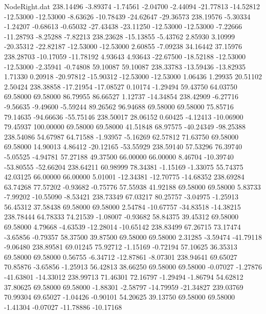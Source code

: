 \begin{filecontents}{NodeRight.dat}
 238.14496   -3.89374   -1.74561    -2.04700   -2.44094  -21.77813  -14.52812  -12.53000  -12.53000   -8.63626  -10.78439  -24.62647  -29.36573
 238.19576   -5.30334   -1.24207    -0.68613   -0.65032  -27.43438  -23.11250  -12.53000  -12.53000   -7.22666  -11.28793   -8.25288   -7.82213
 238.23628  -15.13855   -5.43762     2.85930    3.10999  -20.35312  -22.82187  -12.53000  -12.53000    2.60855   -7.09238   34.16442   37.15976
 238.28703  -10.17059  -11.78192     4.93643    4.93643  -22.67500  -18.52188  -12.53000  -12.53000   -2.35941   -0.74808   59.10087   59.10087
 238.33783  -13.59436  -13.82935     1.71330    0.20918  -20.97812  -15.90312  -12.53000  -12.53000    1.06436    1.29935   20.51102    2.50424
 238.38858  -17.21954  -17.08527     0.10174   -1.29494   59.43750   64.03750   69.58000   69.58000   86.79955   86.66527    1.12737  -14.34854
 238.42909   -6.27716   -9.56635    -9.49600   -5.59244   89.26562   96.94688   69.58000   69.58000   75.85716   79.14635  -94.66636  -55.75146
 238.50017   28.06152    0.60425    -4.12413  -10.06900   79.45937  100.00000   69.58000   69.58000   41.51848   68.97575  -40.24349  -98.25388
 238.54086   54.67987   64.71588    -1.93957   -5.16269   62.57812   71.63750   69.58000   69.58000   14.90013    4.86412  -20.12165  -53.55929
 238.59140   57.53296   76.39740    -5.05525   -4.94781   57.27188   49.37500   66.00000   66.00000    8.46704  -10.39740  -53.80555  -52.66204
 238.64211   60.98999   78.34381    -1.15169   -1.33075   55.74375   42.03125   66.00000   66.00000    5.01001  -12.34381  -12.70775  -14.68352
 238.69284   63.74268   77.57202    -0.93682   -0.75776   57.55938   41.92188   69.58000   69.58000    5.83733   -7.99202  -10.55090   -8.53421
 238.73349   67.03217   80.25757    -3.04975   -1.25913   56.45312   37.58438   69.58000   69.58000    2.54784  -10.67757  -34.83518  -14.38215
 238.78444   64.78333   74.21539    -1.08007   -0.93682   58.84375   39.45312   69.58000   69.58000    4.79668   -4.63539  -12.28014  -10.65142
 238.83499   67.26715   73.17474    -3.65856   -0.79357   58.37500   39.87500   69.58000   69.58000    2.31285   -3.59474  -41.79118   -9.06480
 238.89581   69.01245   75.92712    -1.15169   -0.72194   57.10625   36.35313   69.58000   69.58000    0.56755   -6.34712  -12.87861   -8.07301
 238.94641   69.65027   70.85876    -3.65856   -1.25913   56.42813   38.66250   69.58000   69.58000   -0.07027   -1.27876  -41.63801  -14.33012
 238.99713   71.46301   72.16797    -1.29494   -1.86794   54.62812   37.80625   69.58000   69.58000   -1.88301   -2.58797  -14.79959  -21.34827
 239.03769   70.99304   69.65027    -1.04426   -0.90101   54.20625   39.13750   69.58000   69.58000   -1.41304   -0.07027  -11.78886  -10.17168

\end{filecontents}
